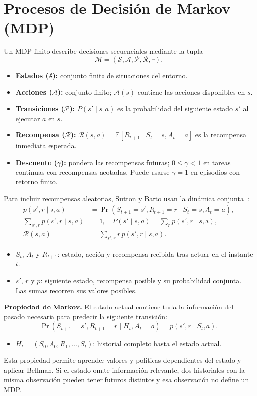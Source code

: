 \section{Procesos de Decisión de Markov (MDP)}
Un MDP finito describe decisiones secuenciales mediante la tupla
\begin{equation}\label{eq:mdp}
    \mathcal{M}=(\mathcal{S},\mathcal{A},\mathcal{P},\mathcal{R},\gamma).
\end{equation}
\begin{itemize}
    \item \textbf{Estados ($\mathcal{S}$):} conjunto finito de situaciones del entorno.
    \item \textbf{Acciones ($\mathcal{A}$):} conjunto finito; $\mathcal{A}(s)$ contiene las acciones disponibles en $s$.
    \item \textbf{Transiciones ($\mathcal{P}$):} $P(s'\mid s,a)$ es la probabilidad del siguiente estado $s'$ al ejecutar $a$ en $s$.
    \item \textbf{Recompensa ($\mathcal{R}$):} $\mathcal{R}(s,a)=\mathbb{E}[R_{t+1}\mid S_t=s,A_t=a]$ es la recompensa inmediata esperada.
    \item \textbf{Descuento ($\gamma$):} pondera las recompensas futuras; $0\leq\gamma<1$ en tareas continuas con recompensas acotadas. Puede usarse $\gamma=1$ en episodios con retorno finito.
\end{itemize}
Para incluir recompensas aleatorias, Sutton y Barto usan la dinámica conjunta~\cite[seccs.~3.1--3.3]{sutton}:
\begin{equation}\label{eq:dynamics}
\begin{aligned}
    p(s',r\mid s,a)&=\Pr(S_{t+1}=s',R_{t+1}=r\mid S_t=s,A_t=a),\\
    \sum_{s',r}p(s',r\mid s,a)&=1,\quad
    P(s'\mid s,a)=\sum_r p(s',r\mid s,a),\\
    \mathcal{R}(s,a)&=\sum_{s',r}r\,p(s',r\mid s,a).
\end{aligned}
\end{equation}
\begin{itemize}
    \item $S_t$, $A_t$ y $R_{t+1}$: estado, acción y recompensa recibida tras actuar en el instante $t$.
    \item $s'$, $r$ y $p$: siguiente estado, recompensa posible y su probabilidad conjunta. Las sumas recorren sus valores posibles.
\end{itemize}

\textbf{Propiedad de Markov.} El estado actual contiene toda la información del pasado necesaria para predecir la siguiente transición:
\begin{equation}\label{eq:markov}
    \Pr(S_{t+1}=s',R_{t+1}=r\mid H_t,A_t=a)
    =p(s',r\mid S_t,a).
\end{equation}
\begin{itemize}
    \item $H_t=(S_0,A_0,R_1,\ldots,S_t)$: historial completo hasta el estado actual.
\end{itemize}
Esta propiedad permite aprender valores y políticas dependientes del estado y aplicar Bellman. Si el estado omite información relevante, dos historiales con la misma observación pueden tener futuros distintos y esa observación no define un MDP.
